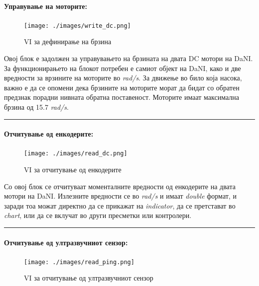 \documentclass[11pt]{article}
\begin{document}
    \paragraph{Управување на моторите:\\}
      \begin{figure}[h]
        \centering
        \texttt{[image: ./images/write\_dc.png]}
				\caption{VI за дефинирање на брзина}
				\label{fig:write_dc.png}
				\end{figure}
			Овој блок е задолжен за управувањето на брзината на двата DC мотори на DaNI. За функционирањето на блокот потребен е самиот објект на DaNI, како и две вредности за врзините на моторите во \textit{rad/s}. За движење во било која насока, важно е да се опомени дека брзините на моторите морат да бидат со обратен предзнак порадни нивната обратна поставеност. Моторите имаат максимална брзина од 15.7 \textit{rad/s}.\\
      \textcolor[RGB]{150,150,150}{\rule{\linewidth}{1.6pt}}

    \paragraph{Отчитување од енкодерите:\\}
    	\begin{figure}[h]
        \centering
        \texttt{[image: ./images/read\_dc.png]}
				\caption{VI за отчитување од енкодерите}
				\label{fig:read_dc.png}
				\end{figure}

      Со овој блок се отчитуваат моменталните вредности од енкодерите на двата мотори на DaNI. Излезните вредности се во \textit{rad/s} и имаат \textit{double} формат, и заради тоа можат директно да се прикажат на \textit{indicator}, да се претстават во \textit{chart}, или да се вклучат во други пресметки или контролери.\\
      \textcolor[RGB]{150,150,150}{\rule{\linewidth}{1.6pt}}

    \paragraph{Отчитување од ултразвучниот сензор:\\}
        \begin{figure}[H]
          \centering
          \texttt{[image: ./images/read\_ping.png]}
				  \caption{VI за отчитување од ултразвучниот сензор}
				  \label{fig:read_ping.png}
				  \end{figure}
\end{document}
